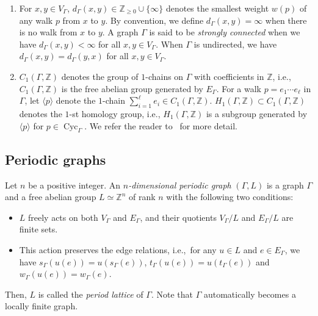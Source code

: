 \documentclass[ALCO,published]{cedram}
\theoremstyle{remark}
\begin{document}
\begin{defi}
\begin{enumerate}
\item 
For $x, y \in V_{\Gamma}$, $d_{\Gamma}(x, y) \in \mathbb{Z}_{\ge 0} \cup \{ \infty \}$ denotes the smallest weight $w(p)$ of any walk $p$ from $x$ to $y$. 
By convention, we define $d_{\Gamma}(x, y) = \infty$ when there is no walk from $x$ to $y$. 
A graph $\Gamma$ is said to be \textit{strongly connected} 
when we have $d_{\Gamma}(x, y) < \infty$ for all $x, y \in V_{\Gamma}$. 
When $\Gamma$ is undirected, we have $d_{\Gamma}(x,y) = d_{\Gamma}(y,x)$ for all $x,y \in V_{\Gamma}$. 

\item 
$C_1(\Gamma, \mathbb{Z})$ denotes the group of $1$-chains on $\Gamma$ with coefficients in $\mathbb{Z}$, i.e., 
$C_1(\Gamma, \mathbb{Z})$ is the free abelian group generated by $E_{\Gamma}$. 
For a walk $p = e_1 \cdots e_{\ell}$ in $\Gamma$, let $\langle p \rangle$ denote the $1$-chain 
$\sum _{i = 1} ^{\ell} e_i \in C_1(\Gamma, \mathbb{Z})$. 
$H_1(\Gamma, \mathbb{Z}) \subset C_1(\Gamma, \mathbb{Z})$ denotes the $1$-st homology group, i.e., 
$H_1(\Gamma, \mathbb{Z})$ is a subgroup generated by $\langle p \rangle$ for $p \in \operatorname{Cyc}_{\Gamma}$. 
We refer the reader to~\cite{Sunada} for more detail. 
\end{enumerate}
\end{defi}

\subsection{Periodic graphs}

\begin{defi}\label{defi:pg}
Let $n$ be a positive integer. 
An \textit{$n$-dimensional periodic graph} $(\Gamma, L)$ is a graph $\Gamma$ and 
a free abelian group $L \simeq \mathbb{Z}^n$ of rank $n$ with the following two conditions:
\begin{itemize}
\item $L$ freely acts on both $V_\Gamma$ and $E_\Gamma$, 
and their quotients $V_\Gamma / L$ and $E_\Gamma / L$ are finite sets. 
\item This action preserves the edge relations, i.e.,\ for any $u \in L$ and $e \in E_\Gamma$, 
we have $s_\Gamma(u(e))=u(s_\Gamma(e))$, $t_\Gamma(u(e))=u(t_\Gamma(e))$ and 
$w_{\Gamma}(u(e))=w_{\Gamma}(e)$.
\end{itemize}
Then, $L$ is called the \textit{period lattice} of $\Gamma$. 
Note that $\Gamma$ automatically becomes a locally finite graph. 
\end{defi}
\end{document}
